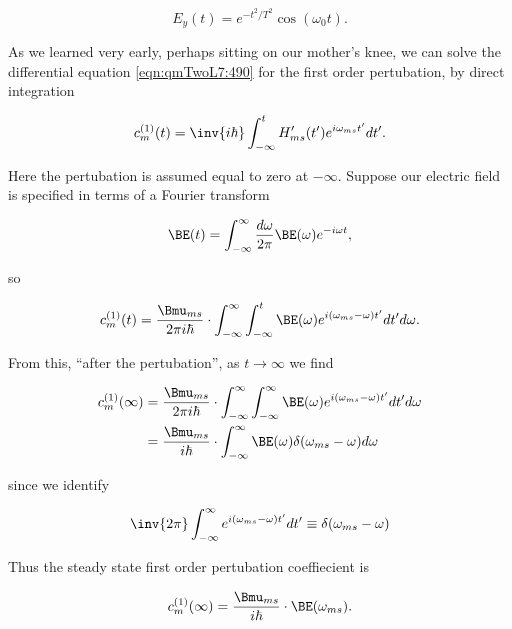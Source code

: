 \begin{equation}\label{eqn:qmTwoL7:590}
E_y(t) = e^{-t^2/T^2} \cos(\omega_0 t).
\end{equation}

As we learned very early, perhaps sitting on our mother's knee, we can solve the differential equation \ref{eqn:qmTwoL7:490} for the first order pertubation, by direct integration

\begin{equation}\label{eqn:qmTwoL7:510}
c_m^{(1)}(t) =
\inv{i \hbar} \int_{-\infty}^t
H_{ms}'(t') e^{i \omega_{ms} t'} dt'.
\end{equation}

Here the pertubation is assumed equal to zero at $-\infty$.  Suppose our electric field is specified in terms of a Fourier transform

\begin{equation}\label{eqn:qmTwoL7:530}
\BE(t) = \int_{-\infty}^\infty \frac{d \omega}{2\pi} \BE(\omega) e^{-i \omega t},
\end{equation}

so

\begin{equation}\label{eqn:qmTwoL7:550}
c_m^{(1)}(t) =
\frac{\Bmu_{ms}}{2 \pi i \hbar} \cdot
\int_{-\infty}^\infty
\int_{-\infty}^t
\BE(\omega)
e^{i (\omega_{ms} -\omega) t'} dt' d\omega.
\end{equation}

From this, ``after the pertubation'', as $t \rightarrow \infty$ we find

\begin{align*}
c_m^{(1)}(\infty)
&=
\frac{\Bmu_{ms}}{2 \pi i \hbar} \cdot
\int_{-\infty}^\infty
\int_{-\infty}^\infty
\BE(\omega)
e^{i (\omega_{ms} -\omega) t'} dt' d\omega \\
&=
\frac{\Bmu_{ms}}{i \hbar} \cdot
\int_{-\infty}^\infty
\BE(\omega)
\delta(\omega_{ms} - \omega)
d\omega
\end{align*}

since we identify

\begin{equation}\label{eqn:qmTwoL7:570}
\inv{2 \pi}
\int_{-\infty}^\infty
e^{i (\omega_{ms} -\omega) t'} dt' \equiv \delta(\omega_{ms} - \omega)
\end{equation}

Thus the steady state first order pertubation coeffiecient is

\begin{equation}\label{eqn:qmTwoL7:590}
c_m^{(1)}(\infty)
=
\frac{\Bmu_{ms}}{i \hbar} \cdot
\BE(\omega_{ms}).
\end{equation}

